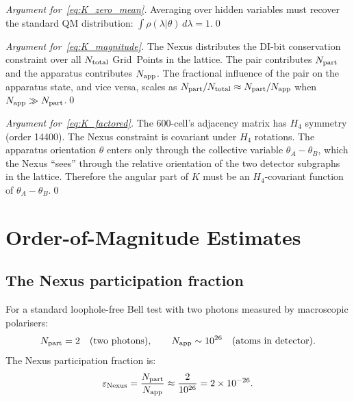 \documentclass[11pt,a4paper]{article}
\newcommand{\eps}{\varepsilon}
\begin{document}
\begin{proof}[Argument for~\eqref{eq:K_zero_mean}]
Averaging over hidden variables must recover the standard QM
distribution: $\int \rho(\lambda|\theta)\,d\lambda = 1$.\qed
\end{proof}

\begin{proof}[Argument for~\eqref{eq:K_magnitude}]
The Nexus distributes the DI-bit conservation constraint over all
$N_{\rm total}$ Grid~Points in the lattice.  The pair contributes
$N_{\rm part}$ and the apparatus contributes $N_{\rm app}$.  The
fractional influence of the pair on the apparatus state, and vice
versa, scales as $N_{\rm part}/N_{\rm total} \approx
N_{\rm part}/N_{\rm app}$ when $N_{\rm app} \gg N_{\rm part}$.\qed
\end{proof}

\begin{proof}[Argument for~\eqref{eq:K_factored}]
The 600-cell's adjacency matrix has $H_4$ symmetry (order 14400).
The Nexus constraint is covariant under $H_4$ rotations.  The
apparatus orientation $\theta$ enters only through the collective
variable $\theta_A - \theta_B$, which the Nexus ``sees'' through
the relative orientation of the two detector subgraphs in the
lattice.  Therefore the angular part of $K$ must be an $H_4$-covariant
function of $\theta_A - \theta_B$.\qed
\end{proof}

\section{Order-of-Magnitude Estimates}
\label{sec:magnitude}

\subsection{The Nexus participation fraction}

For a standard loophole-free Bell test with two photons measured by
macroscopic polarisers:
\begin{equation}
N_{\rm part} = 2 \quad (\text{two photons}), \qquad
N_{\rm app} \sim 10^{26} \quad (\text{atoms in detector}).
\label{eq:N_values}
\end{equation}
The Nexus participation fraction is:
\begin{equation}
\eps_{\rm Nexus} = \frac{N_{\rm part}}{N_{\rm app}}
\approx \frac{2}{10^{26}} = 2 \times 10^{-26}.
\label{eq:eps}
\end{equation}
\end{document}
